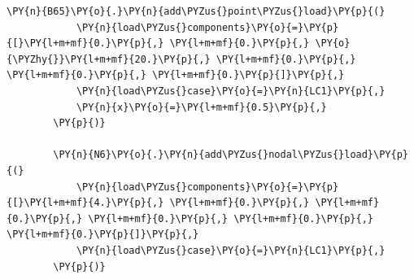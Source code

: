 \begin{tcolorbox}[breakable, size=fbox, boxrule=1pt, pad at break*=1mm,colback=cellbackground, colframe=cellborder]
\begin{Verbatim}[commandchars=\\\{\}]
        \PY{n}{B65}\PY{o}{.}\PY{n}{add\PYZus{}point\PYZus{}load}\PY{p}{(}
            \PY{n}{load\PYZus{}components}\PY{o}{=}\PY{p}{[}\PY{l+m+mf}{0.}\PY{p}{,} \PY{l+m+mf}{0.}\PY{p}{,} \PY{o}{\PYZhy{}}\PY{l+m+mf}{20.}\PY{p}{,} \PY{l+m+mf}{0.}\PY{p}{,} \PY{l+m+mf}{0.}\PY{p}{,} \PY{l+m+mf}{0.}\PY{p}{]}\PY{p}{,}
            \PY{n}{load\PYZus{}case}\PY{o}{=}\PY{n}{LC1}\PY{p}{,}
            \PY{n}{x}\PY{o}{=}\PY{l+m+mf}{0.5}\PY{p}{,}
        \PY{p}{)}
        
        \PY{n}{N6}\PY{o}{.}\PY{n}{add\PYZus{}nodal\PYZus{}load}\PY{p}{(}
            \PY{n}{load\PYZus{}components}\PY{o}{=}\PY{p}{[}\PY{l+m+mf}{4.}\PY{p}{,} \PY{l+m+mf}{0.}\PY{p}{,} \PY{l+m+mf}{0.}\PY{p}{,} \PY{l+m+mf}{0.}\PY{p}{,} \PY{l+m+mf}{0.}\PY{p}{,} \PY{l+m+mf}{0.}\PY{p}{]}\PY{p}{,}
            \PY{n}{load\PYZus{}case}\PY{o}{=}\PY{n}{LC1}\PY{p}{,}
        \PY{p}{)}
    \end{Verbatim}
\end{tcolorbox}

